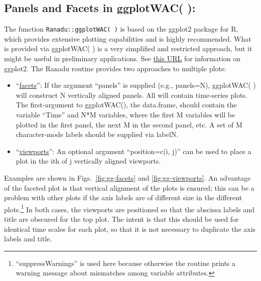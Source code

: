 \documentclass[12pt,english]{report}\usepackage[]{graphicx}\usepackage[]{color}
\begin{document}
\subsection{Panels and Facets in ggplotWAC( ):}

The function \texttt{Ranadu::ggplotWAC( )} is based on the ggplot2
package for R, which provides extensive plotting capabilities and
is highly recommended. What is provided via ggplotWAC( ) is a very
simplified and restricted approach, but it might be useful in preliminary
applications. See \href{http://had.co.nz/ggplot2/}{this URL} for
information on ggplot2. The Ranadu routine provides two approaches
to multiple plots:
\begin{itemize}
\item ``\uline{facets}'': If the argument ``panels'' is supplied
(e.g., panels=N), ggplotWAC( ) will construct N vertically aligned
panels. All will contain time-series plots. The first-argument to
ggplotWAC(), the data.frame, should contain the variable ``Time''
and N{*}M variables, where the first M variables will be plotted in
the first panel, the next M in the second panel, etc. A set of M character-mode
labels should be supplied via labelN.
\item ``\uline{viewports}'': An optional argument ``position=c(i,
j)'' can be used to place a plot in the ith of j vertically aligned
viewports.
\end{itemize}
Examples are shown in Figs.~\ref{fig:gg-facets} and \ref{fig:gg-viewports}.
An advantage of the faceted plot is that vertical alignment of the
plots is ensured; this can be a problem with other plots if the axis
labels are of different size in the different plots.\footnote{``suppressWarnings'' is used here because otherwise the routine
prints a warning message about mismatches among variable attributes.} In both cases, the viewports are positioned so that the abscissa
labels and title are obscured for the top plot. The intent is that
this should be used for identical time scales for each plot, so that
it is not necessary to duplicate the axis labels and title.
\end{document}
